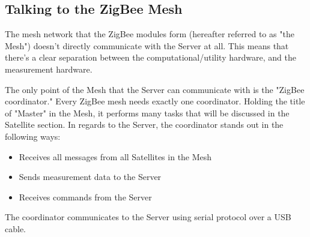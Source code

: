 
\subsection{Talking to the ZigBee Mesh}
The mesh network that the ZigBee modules
form (hereafter referred to as "the Mesh") doesn't directly communicate with the Server
at all. This means that there's a clear separation between the computational/utility
hardware, and the measurement hardware.

The only point of the Mesh that the Server can communicate with is the "ZigBee coordinator."
Every ZigBee mesh needs exactly one coordinator. Holding the title of "Master" in the
Mesh, it performs many tasks that will be discussed in the Satellite section. 
In regards to the Server, the coordinator stands out in the following ways:

\begin{itemize}
	\item Receives all messages from all Satellites in the Mesh
	\item Sends measurement data to the Server
	\item Receives commands from the Server
\end{itemize}

The coordinator communicates to the Server using serial protocol over a \ac{USB} cable.